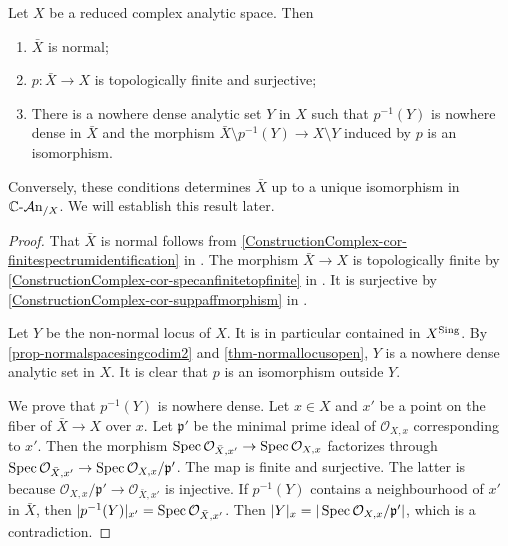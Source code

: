 \begin{proposition}\label{prop-reducedspacenormalizationchar}
    Let $X$ be a reduced complex analytic space. Then 
    \begin{enumerate}
        \item $\bar{X}$ is normal;
        \item $p:\bar{X}\rightarrow X$ is topologically finite and surjective;
        \item There is a nowhere dense analytic set $Y$ in $X$ such that $p^{-1}(Y)$ is nowhere dense in $\bar{X}$ and the morphism $\bar{X}\setminus p^{-1}(Y)\rightarrow X\setminus Y$ induced by $p$ is an isomorphism.
    \end{enumerate}
\end{proposition}

Conversely, these conditions determines $\bar{X}$ up to a unique isomorphism in $\mathbb{C}\text{-}\mathcal{A}\mathrm{n}_{/X}$. We will establish this result later.

\begin{proof}
    That $\bar{X}$ is normal follows from \cref{ConstructionComplex-cor-finitespectrumidentification} in .
    The morphism $\bar{X}\rightarrow X$ is topologically finite by \cref{ConstructionComplex-cor-specanfinitetopfinite} in . It is surjective by \cref{ConstructionComplex-cor-suppaffmorphism} in .

    Let $Y$ be the non-normal locus of $X$. It is in particular contained in $X^{\operatorname{Sing}}$. By \cref{prop-normalspacesingcodim2} and \cref{thm-normallocusopen}, $Y$ is a nowhere dense analytic set in $X$. It is clear that $p$ is an isomorphism outside $Y$. 
    
    We prove that $p^{-1}(Y)$ is nowhere dense. Let $x\in X$ and $x'$ be a point on the fiber of $\bar{X}\rightarrow X$ over $x$. Let $\mathfrak{p}'$ be the minimal prime ideal of $\mathcal{O}_{X,x}$ corresponding to $x'$. Then the morphism $\operatorname{Spec} \mathcal{O}_{\bar{X},x'}\rightarrow \operatorname{Spec} \mathcal{O}_{X,x}$ factorizes through $\operatorname{Spec} \mathcal{O}_{\bar{X},x'}\rightarrow \operatorname{Spec} \mathcal{O}_{X,x}/\mathfrak{p}'$. The map is finite and surjective. The latter is because $\mathcal{O}_{X,x}/\mathfrak{p}'\rightarrow \mathcal{O}_{\bar{X},x'}$ is injective. If $p^{-1}(Y)$ contains a neighbourhood of $x'$ in $\bar{X}$, then $|p^{-1}(Y)|_{x'}=\operatorname{Spec} \mathcal{O}_{\bar{X},x'}$. Then $|Y|_x=|\operatorname{Spec} \mathcal{O}_{X,x}/\mathfrak{p}'|$, which is a contradiction.

\end{proof}

